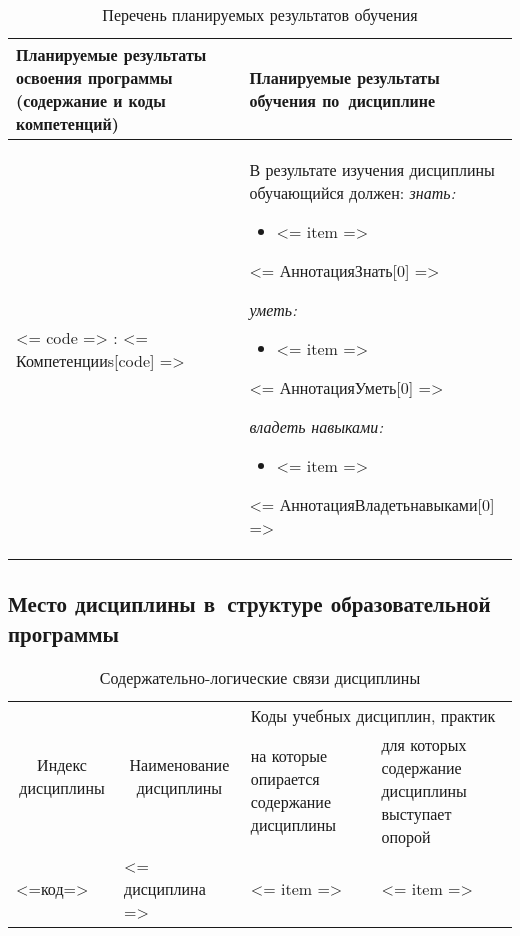 \documentclass[a4paper,12pt]{article}
\begin{document}
  \begin{longtable}{|p{70mm}|p{84mm}|}
  \caption{Перечень планируемых результатов обучения}\\
  \hline
  \centering
  Планируемые результаты освоения программы (содержание и коды компетенций) & 
  \centering\arraybackslash
  Планируемые результаты обучения по~дисциплине
  \\
  \hline
  <= code => : <= Компетенцииs[code] =>%
  & 
  В результате изучения дисциплины обучающийся должен:\newline
  \emph{знать:}%
  \begin{itemize}%
    \item <= item => %
  \end{itemize}
  <= АннотацияЗнать[0] =>

  \emph{уметь:}%
  \begin{itemize}%
    \item <= item => %
  \end{itemize}
  <= АннотацияУметь[0] =>

  \emph{владеть навыками:}%
  \begin{itemize}%
    \item <= item => %
  \end{itemize}
  <= АннотацияВладетьнавыками[0] =>
  \\
  \hline
  \end{longtable}


\subsection{Место дисциплины в~структуре образовательной программы}

  \begin{table}[H]
  \setlength\arraycolsep{3pt}
  \caption{Содержательно-логические связи дисциплины}
  \begin{tabular}{|l|p{18ex}|*{2}{p{23ex}|}}
  \hline
  \multicolumn{1}{|c|}{\multirow{2}{13ex}{\centering Индекс \linebreak дисциплины}} &
  \multicolumn{1}{c|}{\multirow{2}{18ex}{\centering Наименование \linebreak дисциплины}} & 
  \multicolumn{2}{p{46ex}|}{\centering Коды учебных дисциплин, практик} \\
  \cline{3-4}
   & & 
  \centering на которые опирается содержание дисциплины & 
  \centering\arraybackslash для которых содержание дисциплины выступает опорой
  \\ \hline
  <=код=> & <= дисциплина => 
  & 
  <= item =>%
  & 
  <= item =>%
  \\ \hline
  \end{tabular}
  \end{table}
\end{document}
